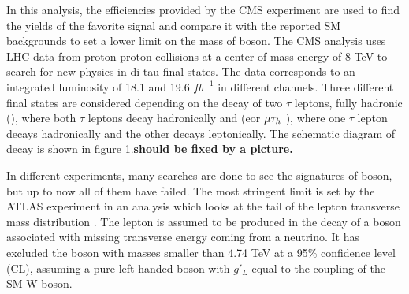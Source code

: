 In this analysis, the efficiencies provided by the CMS experiment \cite{Khachatryan:2016trj} are used to find the yields of the favorite signal and compare it with the reported SM backgrounds to set a lower limit on the mass of \wprime boson. 
The CMS analysis uses LHC data from proton-proton collisions at a center-of-mass energy of 8 TeV to search for new physics in di-tau final states.  The data corresponds to an integrated luminosity of 18.1 and 19.6 $fb^{-1}$ in different channels. Three different final states are considered depending on the decay of two $\tau$ leptons, fully hadronic (\tauTau), where both $\tau$ leptons decay hadronically and \lepTau (e\Tau or $\mu\tau_h~$), where one $\tau$ lepton decays hadronically and the other decays leptonically. The schematic diagram of decay is shown in figure 1.{\bf should be fixed by a picture.}

In different experiments, many searches are done to see the signatures of \wprime boson, but up to now all of them have failed. The most stringent limit is set by the ATLAS experiment in an analysis which looks at the tail of the lepton transverse mass distribution \cite{ATLAS:2016ecs}. The lepton is assumed to be produced in the decay of a \wprime boson associated with missing transverse energy coming from a neutrino. It has excluded the \wprime boson with masses smaller than 4.74 TeV at a 95\% confidence level (CL), assuming a pure left-handed \wprime boson with $g'_L$ equal to the coupling of the SM W boson. 